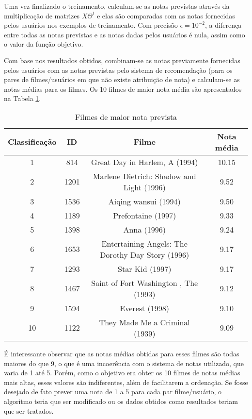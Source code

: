 \documentclass[12pt]{article}
\begin{document}
Uma vez finalizado o treinamento, calculam-se as notas previstas através da multiplicação de matrizes $X\Theta^t$ e elas são comparadas com as notas fornecidas pelos usuários nos exemplos de treinamento. Com precisão $\epsilon = 10^{-2}$, a diferença entre todas as notas previstas e as notas dadas pelos usuários é nula, assim como o valor da função objetivo.

Com base nos resultados obtidos, combinam-se as notas previamente fornecidas pelos usuários com as notas previstas pelo sistema de recomendação (para os pares de filmes/usuários em que não existe atribuição de nota) e calculam-se as notas médias para os filmes. Os 10 filmes de maior nota média são apresentados na Tabela \ref{tabela_rec}.  

\begin{table} [h]
\begin{tabular}{cccc}
\hline 
Classificação & ID & Filme & Nota média\\
\hline
1 & 814 & Great Day in Harlem,  A (1994) & 10.15\\
2 & 1201 & Marlene Dietrich: Shadow and Light (1996)  & 9.52\\
3 & 1536 & Aiqing wansui (1994) & 9.50\\
4 & 1189 & Prefontaine (1997) & 9.33\\
5 & 1398 & Anna (1996) & 9.24\\
6 & 1653 & Entertaining Angels: The Dorothy Day Story (1996) & 9.17\\
7 & 1293 & Star Kid (1997) & 9.17\\
8 & 1467 & Saint of Fort Washington ,  The (1993) & 9.12\\
9 & 1594 & Everest (1998) & 9.10\\
10 & 1122 & They Made Me a Criminal (1939) & 9.09\\
\hline 
\end{tabular} 
\caption{Filmes de maior nota prevista}
\label{tabela_rec}
\end{table}

É interessante observar que as notas médias obtidas para esses filmes são todas maiores do que 9, o que é uma incoerência com o sistema de notas utilizado, que varia de 1 até 5. Porém, como o objetivo era obter os 10 filmes de notas médias mais altas, esses valores são indiferentes, além de facilitarem a ordenação. Se fosse desejado de fato prever uma nota de 1 a 5 para cada par filme/usuário, o algoritmo teria que ser modificado ou os dados obtidos como resultados teriam que ser tratados.
\end{document}
